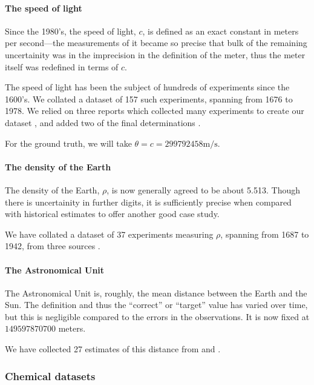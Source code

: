 \documentclass[letterpaper,12pt]{article}
\begin{document}
\paragraph{The speed of light}

Since the 1980's, the speed of light, $c$, is defined as an exact constant in meters per second---the measurements of it became so precise that bulk of the remaining uncertainity was in the imprecision in the definition of the meter, thus the meter itself was redefined in terms of $c$.

The speed of light has been the subject of hundreds of experiments since the 1600's. We collated a dataset of 157 such experiments, spanning from 1676 to 1978. We relied on three reports which collected many experiments to create our dataset \citep{birge1934velocity,froome1971velocity,raynaud2013determining}, and added two of the final determinations \citep{evenson1972speed,blaney1974measurement}.

For the ground truth, we will take $\theta=c=299792458\mathrm{m}/\mathrm{s}$.

\paragraph{The density of the Earth}

The density of the Earth, $\rho$, is now generally agreed to be about 5.513. Though there is uncertainity in further digits, it is sufficiently precise when compared with historical estimates to offer another good case study.

We have collated a dataset of 37 experiments measuring $\rho$, spanning from 1687 to 1942, from three sources \citep{burgess1902value,sagitov1970current,hughes2006mean}.

\paragraph{The Astronomical Unit}

The Astronomical Unit is, roughly, the mean distance between the Earth and the Sun. The definition and thus the ``correct'' or ``target'' value has varied over time, but this is negligible compared to the errors in the observations. It is now fixed at $149597870700$ meters.

We have collected 27 estimates of this distance from \citet{atkins1964determination} and \citet{standish2004astronomical}.

\subsubsection{Chemical datasets}
\end{document}
